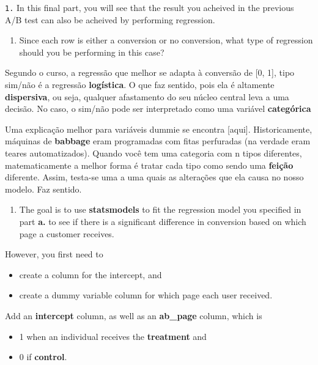 \documentclass[11pt]{article}
\providecommand{\tightlist}{%
      \setlength{\itemsep}{0pt}\setlength{\parskip}{0pt}}
\begin{document}
\texttt{1.} In this final part, you will see that the result you
acheived in the previous A/B test can also be acheived by performing
regression.

\begin{enumerate}
\def\labelenumi{\alph{enumi}.}
\tightlist
\item
  Since each row is either a conversion or no conversion, what type of
  regression should you be performing in this case?
\end{enumerate}

    Segundo o curso, a regressão que melhor se adapta à conversão de {[}0,
1{]}, tipo sim/não é a regressão \textbf{logística}. O que faz sentido,
pois ela é altamente \textbf{dispersiva}, ou seja, qualquer afastamento
do seu núcleo central leva a uma decisão. No caso, o sim/não pode ser
interpretado como uma variável \textbf{categórica}

Uma explicação melhor para variáveis dummie se encontra {[}aqui{]}.
Historicamente, máquinas de \textbf{babbage} eram programadas com fitas
perfuradas (na verdade eram teares automatizados). Quando você tem uma
categoria com n tipos diferentes, matematicamente a melhor forma é
tratar cada tipo como sendo uma \textbf{feição} diferente. Assim,
testa-se uma a uma quais as alterações que ela causa no nosso modelo.
Faz sentido.

    \begin{enumerate}
\def\labelenumi{\alph{enumi}.}
\setcounter{enumi}{1}
\tightlist
\item
  The goal is to use \textbf{statsmodels} to fit the regression model
  you specified in part \textbf{a.} to see if there is a significant
  difference in conversion based on which page a customer receives.
\end{enumerate}

However, you first need to

\begin{itemize}
\item
  create a column for the intercept, and
\item
  create a dummy variable column for which page each user received.
\end{itemize}

Add an \textbf{intercept} column, as well as an \textbf{ab\_page}
column, which is

\begin{itemize}
\item
  1 when an individual receives the \textbf{treatment} and
\item
  0 if \textbf{control}.
\end{itemize}
\end{document}

